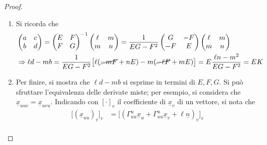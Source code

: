 \documentclass[12pt]{scrartcl}
\theoremstyle{style}
\numberwithin{equation}{subsection}
\begin{document}
\begin{proof}
\begin{enumerate}[(1).]
\[				\] 
			La matrice della I forma \`e invertibile, quindi si dimostra che le componenti del vettore del membro di sinistra si possono esprimere in termini di $E,F,G$. 
			Questo \`e vero perch\'e
			\[
			\begin{split}
				&\underline{x}_u \cdot \underline{x}_{uu} = \frac{1}{2} (\underline{x}_u \cdot \underline{x}_u) = \frac{1}{2} \frac{\partial E}{\partial u} = \frac{1}{2}E_u\\
				&\underline{x}_v \cdot \underline{x}_{uu} = (\underbracket{\underline{x}_v \cdot \underline{x}_u}_{=F} )_u - \underbracket{\underline{x}_{uv} \cdot \underline{x}_u}_{=\frac{1}{2}(\underline{x}_u \cdot \underline{x}_u)_v} = F_u - \frac{1}{2}E_v
			\end{split}
			\] 
			Visto che per gli altri simboli, il discorso \`e analogo, il punto (1) \`e verificato.
		\item Si ricorda che
			\[
			\begin{split}
				&\begin{pmatrix} a & c \\ b & d \end{pmatrix}  = \begin{pmatrix} E & F \\ F & G \end{pmatrix} ^{-1} \begin{pmatrix} \ell & m \\ m &n  \end{pmatrix}  = \frac{1}{EG - F^2} \begin{pmatrix} G & - F \\ -F & E \end{pmatrix}  \begin{pmatrix} \ell & m \\ m & n  \end{pmatrix} \\
				&\Rightarrow \ell d - m b = \frac{1}{EG - F^2} \big[\ell (\cancel{-mF} + nE ) - m (\cancel{-\ell F}+mE)\big]= E \frac{\ell n - m ^2 }{EG-F^2}= EK
			\end{split}
			\] 
		\item Per finire, si mostra che $\ell d - m b$ si esprime in termini di $E,F,G$.
			Si pu\`o sfruttare l'equivalenza delle derivate miste; per esempio, si considera che $\underline{x}_{uuv} = \underline{x}_{uvu} $. 
			Indicando con $[\cdot ]_v$ il coefficiente di $\underline{x}_v$ di un vettore, si nota che
			\[
			\begin{split}
				\big[(\underline{x}_{uu} )_v\big]_v &= \big[(\Gamma^u_{uu} \underline{x}_u + \Gamma_{uu}^u \underline{x}_v + \ell \underline{n})_v \big]_v\\

\end{split}\]
\end{enumerate}
\end{proof}
\end{document}
